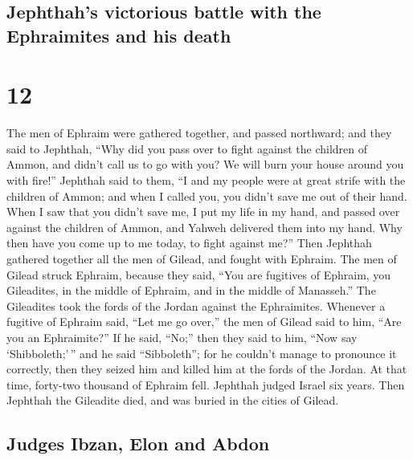 \hypertarget{jephthahs-victorious-battle-with-the-ephraimites-and-his-death}{%
\subsection{Jephthah's victorious battle with the Ephraimites and his
death}\label{jephthahs-victorious-battle-with-the-ephraimites-and-his-death}}

\hypertarget{section-11}{%
\section{12}\label{section-11}}

 The men of Ephraim were gathered together, and passed
northward; and they said to Jephthah, ``Why did you pass over to fight
against the children of Ammon, and didn't call us to go with you? We
will burn your house around you with fire!''  Jephthah
said to them, ``I and my people were at great strife with the children
of Ammon; and when I called you, you didn't save me out of their hand.
 When I saw that you didn't save me, I put my life in my
hand, and passed over against the children of Ammon, and Yahweh
delivered them into my hand. Why then have you come up to me today, to
fight against me?''  Then Jephthah gathered together all
the men of Gilead, and fought with Ephraim. The men of Gilead struck
Ephraim, because they said, ``You are fugitives of Ephraim, you
Gileadites, in the middle of Ephraim, and in the middle of Manasseh.''
 The Gileadites took the fords of the Jordan against the
Ephraimites. Whenever a fugitive of Ephraim said, ``Let me go over,''
the men of Gilead said to him, ``Are you an Ephraimite?'' If he said,
``No;''  then they said to him, ``Now say
`Shibboleth;'\,'' and he said ``Sibboleth''; for he couldn't manage to
pronounce it correctly, then they seized him and killed him at the fords
of the Jordan. At that time, forty-two thousand of Ephraim fell.
 Jephthah judged Israel six years. Then Jephthah the
Gileadite died, and was buried in the cities of Gilead.

\hypertarget{judges-ibzan-elon-and-abdon}{%
\subsection{Judges Ibzan, Elon and
Abdon}\label{judges-ibzan-elon-and-abdon}}

